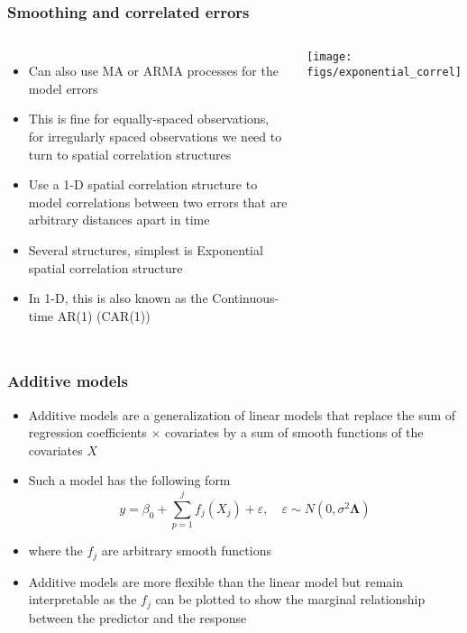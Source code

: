 \documentclass{beamer}
\begin{document}
\begin{frame}
\frametitle{Smoothing and correlated errors}
\small
\begin{columns}
    \column{6cm}
    \begin{itemize}
        \item Can also use MA or ARMA processes for the model errors
        \item This is fine for equally-spaced observations, for irregularly spaced observations we need to turn to spatial correlation structures
        \item Use a 1-D spatial correlation structure to model correlations between two errors that are arbitrary distances apart in time
        \item Several structures, simplest is Exponential spatial correlation structure
        \item In 1-D, this is also known as the Continuous-time AR(1) (CAR(1))
    \end{itemize}

    \column{6cm}
    \texttt{[image: figs/exponential\_correl]}
\end{columns}
\normalsize
\end{frame}

\begin{frame}
   \frametitle{Additive models}
   \begin{itemize}
      \item Additive models are a generalization of linear models that replace the sum of regression coefficients $\times$ covariates by a sum of smooth functions of the covariates $X$
      \item Such a model has the following form
      $$y = \beta_0 + \sum\limits^j_{p=1} f_j(X_j) + \varepsilon, \quad \varepsilon \sim N(0, \sigma^2\mathbf{\Lambda})$$
      \item where the $f_j$ are arbitrary smooth functions
      \item Additive models are more flexible than the linear model but remain interpretable as the $f_j$ can be plotted to show the marginal relationship between the predictor and the response
   \end{itemize}
\end{frame}
\end{document}
